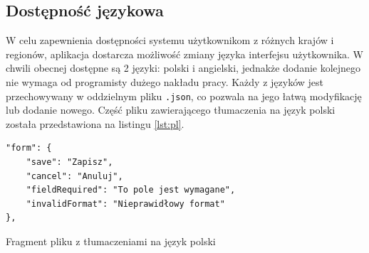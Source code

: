 \subsection{Dostępność językowa}

W celu zapewnienia dostępności systemu użytkownikom z różnych krajów i regionów, aplikacja dostarcza możliwość zmiany języka interfejsu użytkownika. W chwili obecnej dostępne są 2 języki: polski i angielski, jednakże dodanie kolejnego nie wymaga od programisty dużego nakładu pracy. Każdy z języków jest przechowywany w oddzielnym pliku \texttt{.json}, co pozwala na jego łatwą modyfikację lub dodanie nowego. Część pliku zawierającego tłumaczenia na język polski została przedstawiona na listingu \ref{lst:pl}.

\begin{listing}[H]
    \begin{verbatim}
"form": {
    "save": "Zapisz",
    "cancel": "Anuluj",
    "fieldRequired": "To pole jest wymagane",
    "invalidFormat": "Nieprawidłowy format"
},
\end{verbatim}
    \caption{Fragment pliku z tłumaczeniami na język polski}
    \label{lst:pl}
\end{listing}